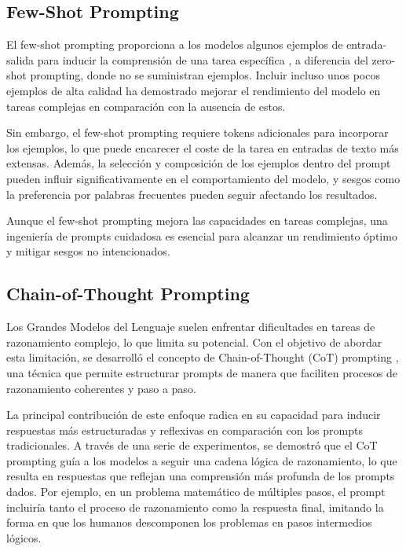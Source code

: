 \subsection{Few-Shot Prompting}
El few-shot prompting proporciona a los modelos algunos ejemplos de entrada-salida para inducir la comprensión de una tarea específica \cite{brown2020language}, a diferencia del zero-shot prompting, donde no se suministran ejemplos. 
Incluir incluso unos pocos ejemplos de alta calidad ha demostrado mejorar el rendimiento del modelo en tareas complejas en comparación con la ausencia de estos. 

Sin embargo, el few-shot prompting requiere tokens adicionales para incorporar los ejemplos, lo que puede encarecer el coste de la tarea en entradas de texto más extensas. 
Además, la selección y composición de los ejemplos dentro del prompt pueden influir significativamente en el comportamiento del modelo, y sesgos como la preferencia por palabras frecuentes pueden seguir afectando los resultados. 

Aunque el few-shot prompting mejora las capacidades en tareas complejas, una ingeniería de prompts cuidadosa es esencial para alcanzar un rendimiento óptimo y mitigar sesgos no intencionados.

\subsection{Chain-of-Thought Prompting}
Los Grandes Modelos del Lenguaje suelen enfrentar dificultades en tareas de razonamiento complejo, lo que limita su potencial. 
Con el objetivo de abordar esta limitación, se desarrolló el concepto de Chain-of-Thought (CoT) prompting \cite{wei2023chainofthoughtpromptingelicitsreasoning}, una técnica que permite estructurar prompts de manera que faciliten procesos de razonamiento coherentes y paso a paso. 

La principal contribución de este enfoque radica en su capacidad para inducir respuestas más estructuradas y reflexivas en comparación con los prompts tradicionales.
A través de una serie de experimentos, se demostró que el CoT prompting guía a los modelos a seguir una cadena lógica de razonamiento, lo que resulta en respuestas que reflejan una comprensión más profunda de los prompts dados. 
Por ejemplo, en un problema matemático de múltiples pasos, el prompt incluiría tanto el proceso de razonamiento como la respuesta final, imitando la forma en que los humanos descomponen los problemas en pasos intermedios lógicos.


